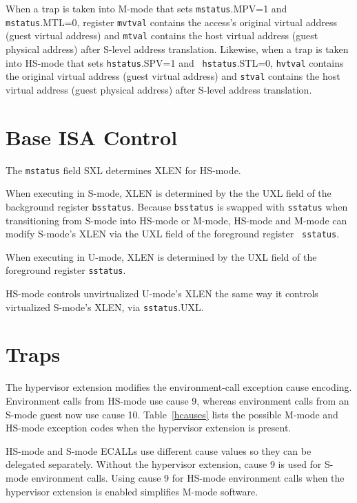 When a trap is taken into M-mode that sets {\tt mstatus}.MPV=1 and {\tt
mstatus}.MTL=0, register {\tt mvtval} contains the access's original virtual
address (guest virtual address) and {\tt mtval} contains the host virtual
address (guest physical address) after S-level address translation.  Likewise,
when a trap is taken into HS-mode that sets {\tt hstatus}.SPV=1 and {\tt
hstatus}.STL=0, {\tt hvtval} contains the original virtual address (guest
virtual address) and {\tt stval} contains the host virtual address (guest
physical address) after S-level address translation.

\section{Base ISA Control}

The {\tt mstatus} field SXL determines XLEN for HS-mode.

When executing in S-mode, XLEN is determined by the the UXL field of the
background register {\tt bsstatus}.  Because {\tt bsstatus} is swapped with
{\tt sstatus} when transitioning from S-mode into HS-mode or M-mode, HS-mode and
M-mode can modify S-mode's XLEN via the UXL field of the foreground register {\tt
sstatus}.

When executing in U-mode, XLEN is determined by the UXL field of the foreground register {\tt sstatus}.

\begin{commentary}
HS-mode controls unvirtualized U-mode's XLEN the same way it controls virtualized S-mode's XLEN, via
{\tt sstatus}.UXL.
\end{commentary}

\section{Traps}

The hypervisor extension modifies the environment-call exception cause
encoding.  Environment calls from HS-mode use cause 9, whereas environment
calls from an S-mode guest now use cause 10.  Table~\ref{hcauses} lists the
possible M-mode and HS-mode exception codes when the hypervisor extension is
present.

\begin{commentary}
HS-mode and S-mode ECALLs use different cause values so they can be delegated
separately.  Without the hypervisor extension, cause 9 is used for S-mode
environment calls.  Using cause 9 for HS-mode environment calls when the
hypervisor extension is enabled simplifies M-mode software.
\end{commentary}

